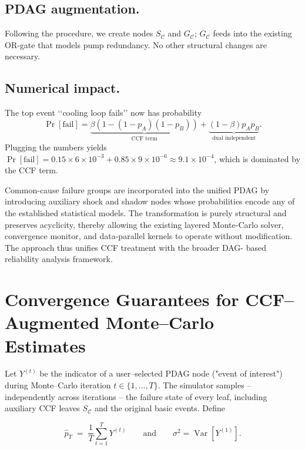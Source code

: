 \subsection*{PDAG augmentation.}  Following the procedure, we create nodes
$S_{\mathcal{C}}$ and $G_{\!\mathcal{C}}$; $G_{\!\mathcal{C}}$ feeds into the
existing OR-gate that models pump redundancy.  No other structural changes are
necessary.

\subsection*{Numerical impact.}  The top event ‘‘cooling loop fails’’ now has
probability
\[
  \Pr[\text{fail}] = \underbrace{\beta(1-(1-p_A)(1-p_B))}_{\text{CCF term}}
                      + \underbrace{(1-\beta)p_A p_B}_{\text{dual independent}}.
\]
Plugging the numbers yields
$\Pr[\text{fail}]=0.15\times 6\!\times10^{-3} + 0.85\times 9\!\times10^{-6}
  \approx 9.1\times10^{-4}$, which is dominated by the CCF term.


Common-cause failure groups are incorporated into the unified PDAG by
introducing auxiliary shock and shadow nodes whose probabilities encode any of
the established statistical models.  The transformation is purely structural
and preserves acyclicity, thereby allowing the existing layered Monte-Carlo
solver, convergence monitor, and data-parallel kernels to operate without
modification.  The approach thus unifies CCF treatment with the broader DAG-
based reliability analysis framework.


\section{Convergence Guarantees for CCF--Augmented Monte--Carlo Estimates}
\label{sec:ccf_convergence}

Let $Y^{(t)}$ be the indicator of a user--selected PDAG node ("event of
interest") during Monte--Carlo iteration $t\in\{1,\dots,T\}$.  The simulator
samples – 
independently across iterations – the failure state of every leaf, including
auxiliary CCF leaves $S_{\mathcal{C}}$ and the original basic events.  Define

\[\widehat{p}_T \;=\; \frac{1}{T}\sum_{t=1}^T Y^{(t)}
  \qquad\text{and}\qquad
  \sigma^2 = \operatorname{Var}[Y^{(1)}].\]

